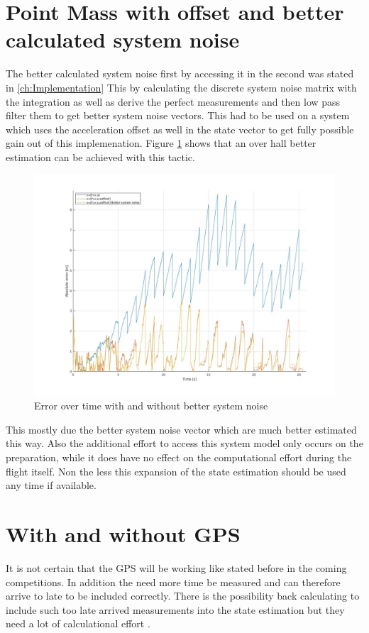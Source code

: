 \section{Point Mass with offset and better calculated system noise}
The better calculated system noise first by accessing it in the second was stated in \ref{ch:Implementation}
This by calculating the discrete system noise matrix with the integration as well as
derive the perfect measurements and then low pass filter them to get better system noise vectors.
This had to be used on a system which uses the acceleration offset as well in the state vector to get fully possible gain out of this implemenation.
Figure \ref{fig:PointMassVSBetterNoise} shows that an over hall better estimation can be achieved with this tactic. 
\begin{figure}[h!]
 \centering
 \includegraphics[width=.8\textwidth]{./Pictures/PointMassVSBetterNoise.jpg}
 \caption{Error over time with and without better system noise}
 \label{fig:PointMassVSBetterNoise}
\end{figure}


This mostly due the better system noise vector which are much better estimated this way.
Also the additional effort to access this system model only occurs on the preparation,
while it does have no effect on the computational effort during the flight itself.
Non the less this expansion of the state estimation should be used any time if available.

\section{With and without GPS}
It is not certain that the GPS will be working like stated before in the coming competitions.
In addition the need more time be measured and can therefore arrive to late to be included correctly.
There is the possibility back calculating to include such too late arrived measurements into the state estimation but they need a lot of calculational effort \cite{SimonDan2006Ose:}.

